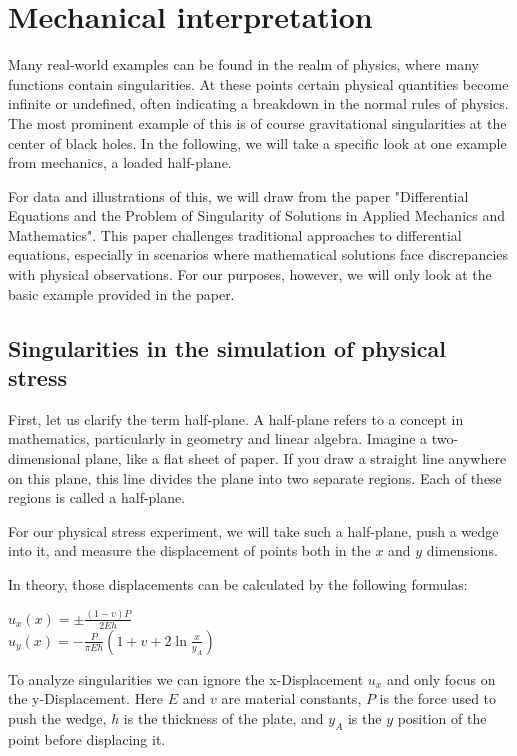 \documentclass[journal]{IEEEtran}
\begin{document}
\section{Mechanical interpretation}
Many real-world examples can be found in the realm of physics, where many functions contain singularities. At these points certain physical quantities become infinite or undefined, often indicating a breakdown in the normal rules of physics. The most prominent example of this is of course gravitational singularities at the center of black holes. In the following, we will take a specific look at one example from mechanics, a loaded half-plane.

For data and illustrations of this, we will draw from the paper "Differential Equations and the Problem of Singularity of Solutions in Applied Mechanics and Mathematics"\cite{Vasiliev}. This paper challenges traditional approaches to differential equations, especially in scenarios where mathematical solutions face discrepancies with physical observations. For our purposes, however, we will only look at the basic example provided in the paper.

\subsection{Singularities in the simulation of physical stress}
First, let us clarify the term half-plane. A half-plane refers to a concept in mathematics, particularly in geometry and linear algebra. Imagine a two-dimensional plane, like a flat sheet of paper. If you draw a straight line anywhere on this plane, this line divides the plane into two separate regions. Each of these regions is called a half-plane.

For our physical stress experiment, we will take such a half-plane, push a wedge into it, and measure the displacement of points both in the $x$ and $y$ dimensions.

In theory, those displacements can be calculated by the following formulas:
\begin{center}
$u_x(x) = \pm\frac{(1-v)P}{2Eh}$\\
$u_y(x) = -\frac{P}{\pi Eh}(1+v+2\ln{\frac{x}{y_A}})$
\end{center}
To analyze singularities we can ignore the x-Displacement $u_x$ and only focus on the y-Displacement.
Here $E$ and $v$ are material constants, $P$ is the force used to push the wedge, $h$ is the thickness of the plate, and $y_A$ is the $y$ position of the point before displacing it.
\end{document}
